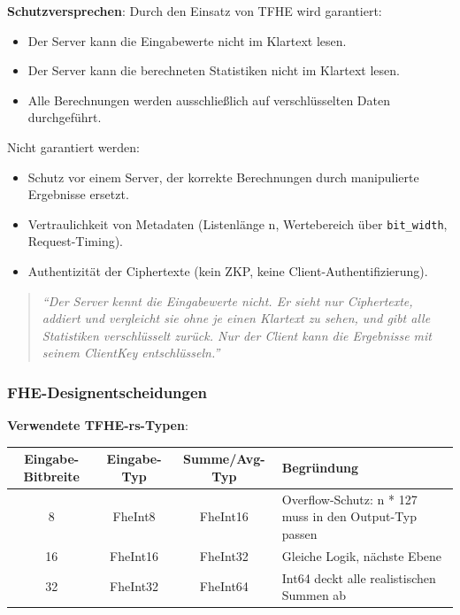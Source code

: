\textbf{Schutzversprechen}:
Durch den Einsatz von TFHE wird garantiert:
\begin{itemize}
    \item Der Server kann die Eingabewerte nicht im Klartext lesen.
    \item Der Server kann die berechneten Statistiken nicht im Klartext lesen.
    \item Alle Berechnungen werden ausschließlich auf verschlüsselten Daten durchgeführt.
\end{itemize}
Nicht garantiert werden:
\begin{itemize}
    \item Schutz vor einem Server, der korrekte Berechnungen durch manipulierte Ergebnisse ersetzt.
    \item Vertraulichkeit von Metadaten (Listenlänge n, Wertebereich über \verb|bit_width|, Request-Timing).
    \item Authentizität der Ciphertexte (kein ZKP, keine Client-Authentifizierung).
\end{itemize}
\begin{quote}
\textit{\enquote{Der Server kennt die Eingabewerte nicht. Er sieht nur Ciphertexte, addiert und vergleicht sie ohne je einen Klartext zu sehen, und gibt alle Statistiken verschlüsselt zurück. Nur der Client kann die Ergebnisse mit seinem ClientKey entschlüsseln.}}
\end{quote}

\subsubsection{FHE-Designentscheidungen}
\textbf{Verwendete TFHE-rs-Typen}:\par
\begin{tabular}{||c|c|c|p{5cm}||}
    \hline
    \textbf{Eingabe-Bitbreite} & \textbf{Eingabe-Typ} & \textbf{Summe/Avg-Typ} & \textbf{Begründung} \\
    \hline\hline
    8 & FheInt8 & FheInt16 & Overflow-Schutz: n * 127 muss in den Output-Typ passen \\
    \hline
    16 & FheInt16 & FheInt32 & Gleiche Logik, nächste Ebene \\
    \hline
    32 & FheInt32 & FheInt64 & Int64 deckt alle realistischen Summen ab \\
    \hline
\end{tabular}

